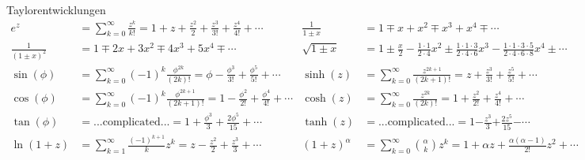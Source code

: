 \begin{Diverses}{Taylorentwicklungen}{}
    \begin{align*}
    e^z &= \sum_{k=0}^{\infty} \frac{z^k}{k!} = 1 + z + \frac{z^2}{2}+ \frac{z^3}{3!}+ \frac{z^4}{4!} + \cdots & 
    \frac{1}{1 \pm x} &= 1 \mp x + x^2 \mp x^3 + x^4 \mp \cdots\\
    \frac{1}{(1 \pm x)^2} &= 1 \mp 2x + 3x^2 \mp 4x^3 + 5x^4 \mp \cdots &
    \sqrt{1 \pm x} &= 1 \pm \frac{x}{2} - \frac{\scriptstyle{1\cdot 1}}{\scriptstyle{2 \cdot 4}}x^2 \pm \frac{\scriptstyle{1\cdot 1 \cdot 3}}{\scriptstyle{2 \cdot 4 \cdot 6}}x^3 - \frac{\scriptstyle{1 \cdot 1 \cdot 3 \cdot 5}}{\scriptstyle{2 \cdot 4 \cdot 6 \cdot 8}}x^4 \pm \scriptstyle\cdots \\
    \sin(\phi) &= \sum_{k=0}^{\infty} (-1)^k \frac{\phi^{2k}}{(2k)!} = \phi - \frac{\phi^3}{3!} + \frac{\phi^5}{5!} + \cdots &
    \sinh(z) &= \sum_{k=0}^{\infty} \frac{z^{2k+1}}{(2k+1)!} = z + \frac{z^3}{3!} + \frac{z^5}{5!} + \cdots\\
    \cos(\phi) &= \sum_{k=0}^{\infty} (-1)^k \frac{\phi^{2k+1}}{(2k+1)!} = 1 - \frac{\phi^2}{2!} + \frac{\phi^4}{4!} + \cdots &
    \cosh(z) &= \sum_{k=0}^{\infty} \frac{z^{2k}}{(2k)!} = 1 + \frac{z^2}{2!} + \frac{z^4}{4!} + \cdots\\
    \tan(\phi) &= \text{...complicated...} = 1 + \frac{\phi^3}{3} + \frac{2\phi^5}{15} + \cdots&
    \tanh(z) &= \text{...complicated...} = 1 \pmb{-} \frac{z^3}{3} \pmb{+} \frac{2z^5}{15} \pmb{-} \cdots\\
    \ln(1+z) &= \sum_{k=1}^{\infty} \frac{(-1)^{k+1}}{k}z^k = z - \frac{z^2}{2} + \frac{z^3}{3} + \scriptstyle\cdots &
    (1+z)^\alpha& = \sum_{k=0}^{\infty}  \binom{\alpha}{k} z^k = 1 + \alpha z + \frac{\alpha(\alpha - 1)}{2!} z ^ 2 + \scriptstyle\cdots
    \end{align*}
\end{Diverses}

